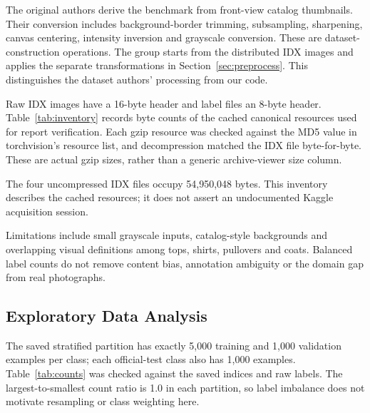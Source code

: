 The original authors derive the benchmark from front-view catalog thumbnails.
Their conversion includes background-border trimming, subsampling, sharpening,
canvas centering, intensity inversion and grayscale conversion.\citep{fashion}
These are dataset-construction operations. The group starts from the distributed
IDX images and applies the separate transformations in Section~\ref{sec:preprocess}.
This distinguishes the dataset authors' processing from our code.

Raw IDX images have a 16-byte header and label files an 8-byte header.
Table~\ref{tab:inventory} records byte counts of the cached canonical resources used
for report verification. Each gzip resource was checked against the MD5 value in
torchvision's resource list, and decompression matched the IDX file byte-for-byte.
These are actual gzip sizes, rather than a generic archive-viewer size column.
\begin{table}[H]\centering\small
\caption{Verified canonical Fashion-MNIST resources in the local cache.}
\label{tab:inventory}

\end{table}
The four uncompressed IDX files occupy 54,950,048 bytes. This inventory describes
the cached resources; it does not assert an undocumented Kaggle acquisition session.

Limitations include small grayscale inputs, catalog-style backgrounds and overlapping
visual definitions among tops, shirts, pullovers and coats. Balanced label counts
do not remove content bias, annotation ambiguity or the domain gap from real photographs.

\subsection{Exploratory Data Analysis}
The saved stratified partition has exactly 5,000 training and 1,000 validation
examples per class; each official-test class also has 1,000 examples.
Table~\ref{tab:counts} was checked against the saved indices and raw labels.
The largest-to-smallest count ratio is 1.0 in each partition, so label imbalance
does not motivate resampling or class weighting here.
\begin{table}[H]\centering\small
\caption{Class support in the fixed seed-36 split.}
\label{tab:counts}

\end{table}

